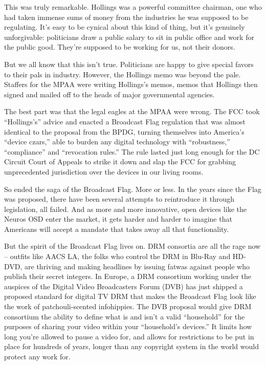 This was truly remarkable. Hollings was a powerful committee
chairman, one who had taken immense sums of money from the
industries he was supposed to be regulating. It's easy to be
cynical about this kind of thing, but it's genuinely unforgivable:
politicians draw a public salary to sit in public office and work
for the public good. They're supposed to be working for us, not
their donors.

But we all know that this isn't true. Politicians are happy to give
special favors to their pals in industry. However, the Hollings
memo was beyond the pale. Staffers for the MPAA were writing
Hollings's memos, memos that Hollings then signed and mailed off to
the heads of major governmental agencies.

The best part was that the legal eagles at the MPAA were wrong. The
FCC took ``Hollings's'' advice and enacted a Broadcast Flag
regulation that was almost identical to the proposal from the BPDG,
turning themselves into America's ``device czars,'' able to burden
any digital technology with ``robustness,'' ``compliance'' and
``revocation rules.'' The rule lasted just long enough for the DC
Circuit Court of Appeals to strike it down and slap the FCC for
grabbing unprecedented jurisdiction over the devices in our living
rooms.

So ended the saga of the Broadcast Flag. More or less. In the years
since the Flag was proposed, there have been several attempts to
reintroduce it through legislation, all failed. And as more and
more innovative, open devices like the Neuros OSD enter the market,
it gets harder and harder to imagine that Americans will accept a
mandate that takes away all that functionality.

But the spirit of the Broadcast Flag lives on. DRM consortia are
all the rage now -- outfits like AACS LA, the folks who control the
DRM in Blu-Ray and HD-DVD, are thriving and making headlines by
issuing fatwas against people who publish their secret integers. In
Europe, a DRM consortium working under the auspices of the Digital
Video Broadcasters Forum (DVB) has just shipped a proposed standard
for digital TV DRM that makes the Broadcast Flag look like the work
of patchouli-scented infohippies. The DVB proposal would give DRM
consortium the ability to define what is and isn't a valid
``household'' for the purposes of sharing your video within your
``household's devices.'' It limits how long you're allowed to pause a
video for, and allows for restrictions to be put in place for
hundreds of years, longer than any copyright system in the world
would protect any work for.

